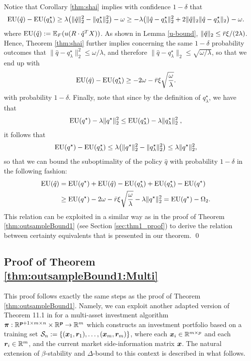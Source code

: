 \documentclass[]{interact}
\theoremstyle{plain}%
\theoremstyle{definition}
\theoremstyle{remark}
\def\Expect{{\mathbb E}}
\newcommand{\0}{\V{0}}
\newcommand{\1}{\V{1}}
\renewcommand{\Re}{\mathbb{R}}
\newcommand{\Halmos}{{\qed}}
\newcommand{\modified}[1]{{\color{blue} #1}}
\def\EU{\mathop{\rm EU}}
\theoremstyle{plain}
\theoremstyle{definition}
\begin{document}
Notice that Corollary \ref{thm:shai} implies with confidence $1-\delta$ that
\[
  \EU(\hat q) - \EU(q^\star_\lambda) \geq \lambda\bigl(\|\hat q\|_2^2 -
  \|q^\star_\lambda\|_2^2\bigr) -\omega
  \geq -\lambda\bigl(\|\hat q -
  q^\star_\lambda\|_2^2 +2\|\qhat\|_2\|\qhat  - q^\star_\lambda\|_2\bigr) - \omega.
\]
where $\EU(\qhat) := \Expect_F(u(R\cdot \qhat^T X))$. As shown in Lemma \ref{u-bound}, $\|{\hat{q}}\|_2 \leq \bar r\xi/(2\lambda)$. Hence, Theorem \ref{thm:shai} further implies concerning the same $1-\delta$ probability outcomes that
$\|\hat q - q^\star_\lambda\|_2^2 \leq \omega/\lambda$, and therefore
$\|\hat q - q^\star_\lambda\|_2 \leq \sqrt{\omega/\lambda}$, so that we end up with
\[
  \EU(\hat q) - \EU(q^\star_\lambda) \geq -2\omega - \bar r\xi\sqrt{\frac{\omega}{\lambda}}.
\]
with probability $1-\delta$. Finally, note that since by the  definition of $q^\star_\lambda$, we have that
\[
  \EU(q^\star) - \lambda\|q^\star\|_2^2 \leq \EU(q^\star_\lambda) - \lambda\|q^\star_\lambda\|_2^2\;,
\]
it follows that
\[
  \EU(q^\star) - \EU(q^\star_\lambda) \leq \lambda\bigl(\|q^\star\|_2^2 -
  \|q^\star_\lambda\|_2^2\bigr) \leq \lambda\|q^\star\|_2^2,
\]
so that we can bound the suboptimality of the policy $\hat q$ with probability $1-\delta$
in the following fashion:
\begin{align*}
  \EU(\hat q) &= \EU(q^\star) + \EU(\hat q) - \EU(q^\star_\lambda) + \EU(q^\star_\lambda)
                - \EU(q^\star)\\
              &\geq \EU(q^\star) - 2\omega - \bar r\xi\sqrt{\frac{\omega}{\lambda}}  - \lambda\|q^\star\|_2^2 =  \EU(q^\star) - \Omega_2.
\end{align*}
This relation can be exploited in a similar way as in the proof of Theorem \ref{thm:outsampleBound1} (see Section \ref{sec:thm1_proof}) to derive the relation between certainty equivalents that is presented in our theorem. \Halmos




\subsection{\modified{Proof of Theorem \ref{thm:outsampleBound1:Multi}}}\label{sec:thm1_proofMulti}
\newcommand{\vinvestA}{{\boldsymbol{\pi}}}

This proof follows exactly the same steps as the proof of Theorem \ref{thm:outsampleBound1}. Namely, we can exploit another adapted version of Theorem 11.1 in \cite{mohri2012foundations} for a multi-asset investment algorithm $\vinvestA:\Re^{\vp+1\times m \times n} \times \Re^\vp \rightarrow \Re^m$ which constructs an investment portfolio based on a training set $\mathcal{S}_n:=\{({\boldsymbol{x}}_1,{\boldsymbol{r}}_1),\dots,({\boldsymbol{x}}_m,{\boldsymbol{r}}_m)\}$, where each $\vx_i \in \Re^{m\times p}$ and each $\vr_i\in\Re^m$,  and the current market side-information matrix ${\boldsymbol{x}}$. The natural extension of $\beta$-stability and $\Delta$-bound to this context is described in what follows.
\end{document}
